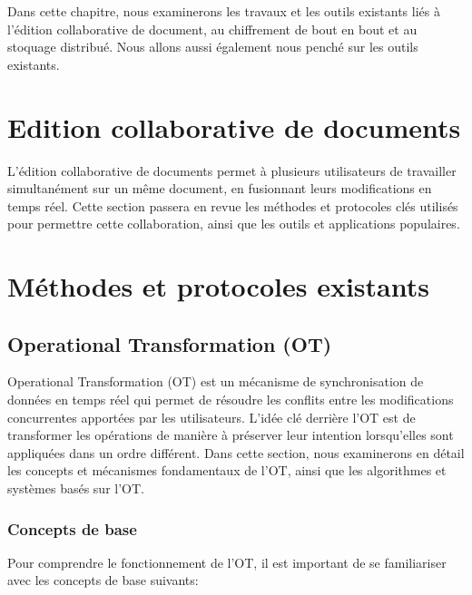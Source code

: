 Dans cette chapitre, nous examinerons les travaux et les outils existants liés à l'édition collaborative de document, au chiffrement de bout en bout et au stoquage distribué.
Nous allons aussi également nous penché sur les outils existants.

\section{Edition collaborative de documents}
L'édition collaborative de documents permet à plusieurs utilisateurs de travailler simultanément sur un même document, en fusionnant leurs modifications en temps réel.
Cette section passera en revue les méthodes et protocoles clés utilisés pour permettre cette collaboration, ainsi que les outils et applications populaires.

\section{Méthodes et protocoles existants}

\subsection{Operational Transformation (OT)}

Operational Transformation (OT) est un mécanisme de synchronisation de données en temps réel qui permet de résoudre les conflits entre les modifications concurrentes apportées par les utilisateurs. L'idée clé derrière l'OT est de transformer les opérations de manière à préserver leur intention lorsqu'elles sont appliquées dans un ordre différent. Dans cette section, nous examinerons en détail les concepts et mécanismes fondamentaux de l'OT, ainsi que les algorithmes et systèmes basés sur l'OT.

\subsubsection{Concepts de base}

Pour comprendre le fonctionnement de l'OT, il est important de se familiariser avec les concepts de base suivants:

